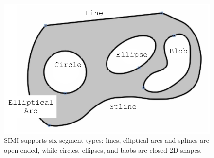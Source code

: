 \begin{figure}
  \centering
  \includegraphics[width=0.7\linewidth]{img/linework.pdf}
  \caption[Segment Types]{SIMI supports six segment types: lines,
    elliptical arcs and splines are open-ended, while circles,
    ellipses, and blobs are closed 2D shapes.}
  \label{fig:linework}
\end{figure}
